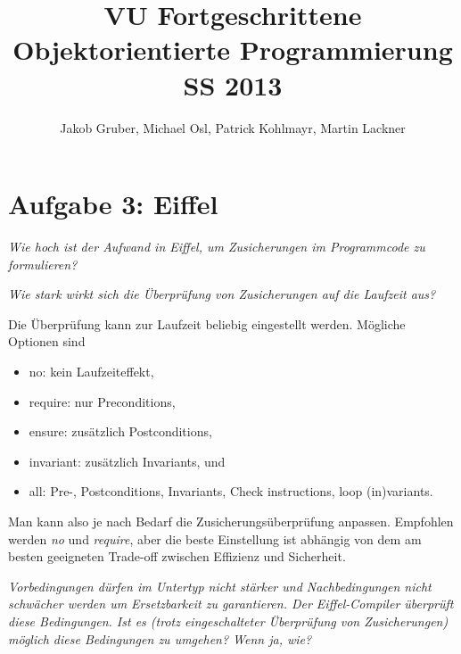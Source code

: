 \documentclass[a4paper,10pt]{article}
\title{VU Fortgeschrittene Objektorientierte Programmierung \\
       SS 2013}
\author{Jakob Gruber,
        Michael Osl,
        Patrick Kohlmayr,
        Martin Lackner}
\begin{document}
\maketitle

\section{Aufgabe 3: Eiffel}


\emph{Wie hoch ist der Aufwand in Eiffel, um Zusicherungen im Programmcode zu 
formulieren?}

\vspace{3mm}


\emph{Wie stark wirkt sich die Überprüfung von Zusicherungen auf die Laufzeit aus?}

\vspace{3mm}

Die \"Uberpr\"ufung kann zur Laufzeit beliebig eingestellt werden. M\"ogliche Optionen sind

\begin{itemize}
\item no: kein Laufzeiteffekt,
\item require: nur Preconditions,
\item ensure: zus\"atzlich Postconditions,
\item invariant: zus\"atzlich Invariants, und
\item all: Pre-, Postconditions, Invariants, Check instructions, loop (in)variants.
\end{itemize}

Man kann also je nach Bedarf die Zusicherungs\"uberpr\"ufung anpassen. Empfohlen werden
\emph{no} und \emph{require}, aber die beste Einstellung ist abh\"angig von dem am besten
geeigneten Trade-off zwischen Effizienz und Sicherheit.

\vspace{3mm}


\emph{Vorbedingungen dürfen im Untertyp nicht stärker und Nachbedingungen nicht 
schwächer werden um Ersetzbarkeit zu garantieren. Der Eiffel-Compiler überprüft 
diese Bedingungen. Ist es (trotz eingeschalteter Überprüfung von Zusicherungen) 
möglich diese Bedingungen zu umgehen? Wenn ja, wie?}
\end{document}
